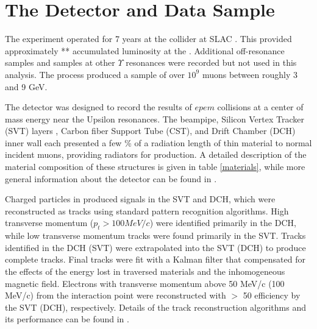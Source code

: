 \section{The \babar Detector and Data Sample}

The \babar experiment operated for 7 years at the 
\pepII collider at SLAC \cite{pepII}.
This provided approximately ** accumulated luminosity at the \FourS.  Additional
off-resonance samples and samples at other $\Upsilon$ resonances were recorded but
not used in this analysis.  The process \eetomm produced a sample of over
$10^9$ muons between roughly 3 and 9 GeV.

The \babar detector was designed to record the results of $epem$ collisions at
a center of mass energy near the Upsilon resonances.  The \babar
beampipe, Silicon Vertex Tracker (SVT) layers , Carbon fiber Support Tube
(CST), and  Drift Chamber (DCH) inner wall each presented a few  \% of a
radiation length of thin material to normal incident muons, providing radiators
for \deltaray production.  A detailed description of the material composition
of these structures is given in table \ref{materials}, while more general
information about the \babar detector can be found in \cite{babarnim}.

Charged particles in \babar produced signals in the SVT and DCH, which were
reconstructed as tracks using standard pattern recognition algorithms.  High
transverse momentum ($p_t > 100 MeV/c$) were identified primarily in the DCH,
while low transverse momentum tracks were found primarily in the SVT.  Tracks
identified in the DCH (SVT) were extrapolated into the SVT (DCH) to produce
complete tracks.  Final tracks were fit with a Kalman filter that compensated
for the effects of the energy lost in traversed materials and the inhomogeneous
\babar magnetic field.  Electrons with transverse momentum above 50 MeV/c (100
MeV/c) from the \epem interaction point were reconstructed with $>$ 50%
efficiency by the SVT (DCH), respectively.  Details of the \babar track
reconstruction algorithms and its performance can be found in \cite{babarnim2}.
